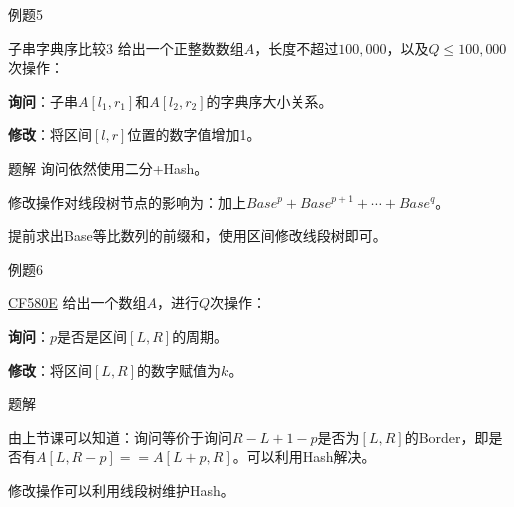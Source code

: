 \documentclass{ctexbeamer}		%
\begin{document}
\begin{frame}{例题5}

\begin{block}{子串字典序比较3}
给出一个正整数数组$A$，长度不超过$100,000$，以及$Q \leq 100,000$次操作：

\textbf{询问}：子串$A[l_1, r_1]$和$A[l_2, r_2]$的字典序大小关系。

\textbf{修改}：将区间$[l,r]$位置的数字值增加1。

\end{block}

\pause

\begin{block}{题解}
询问依然使用二分+Hash。

修改操作对线段树节点的影响为：加上$Base^p + Base^{p+1} + \cdots + Base^q$。

提前求出Base等比数列的前缀和，使用区间修改线段树即可。
\end{block}

\end{frame}

\begin{frame}{例题6}

\begin{block}{\href{http://codeforces.com/problemset/problem/580/E}{CF580E}}
给出一个数组$A$，进行$Q$次操作：

\textbf{询问}：$p$是否是区间$[L,R]$的周期。

\textbf{修改}：将区间$[L,R]$的数字赋值为$k$。
\end{block}

\pause

\begin{block}{题解}

由上节课可以知道：询问等价于询问$R - L + 1 - p$是否为$[L,R]$的Border，即是否有$A[L,R - p] == A[L + p,R]$。可以利用Hash解决。

修改操作可以利用线段树维护Hash。

\end{block}

\end{frame}
\end{document}
